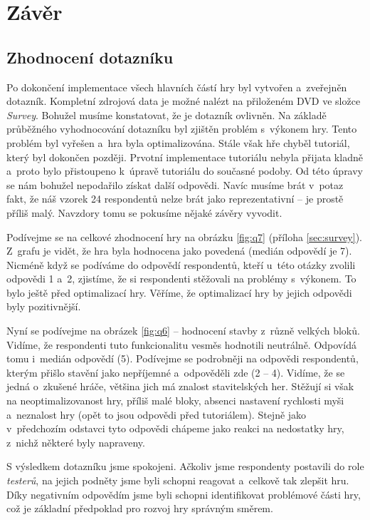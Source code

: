 
\chapter{Závěr}

\section{Zhodnocení dotazníku}
\label{sec:quest}

Po dokončení implementace všech hlavních částí hry byl vytvořen a~zveřejněn dotazník. Kompletní zdrojová data je možné nalézt na přiloženém DVD ve složce \textit{Survey}. Bohužel musíme konstatovat, že je dotazník ovlivněn. Na základě průběžného vyhodnocování dotazníku byl zjištěn problém s~výkonem hry. Tento problém byl vyřešen a~hra byla optimalizována. Stále však hře chyběl tutoriál, který byl dokončen později. Prvotní implementace tutoriálu nebyla přijata kladně a~proto bylo přistoupeno k~úpravě tutoriálu do současné podoby. Od této úpravy se nám bohužel nepodařilo získat další odpovědi. Navíc musíme brát v~potaz fakt, že náš vzorek 24 respondentů nelze brát jako reprezentativní -- je prostě příliš malý. Navzdory tomu se pokusíme nějaké závěry vyvodit.

Podívejme se na celkové zhodnocení hry na obrázku \ref{fig:q7} (příloha \ref{sec:survey}). Z~grafu je vidět, že hra byla hodnocena jako povedená (medián odpovědí je 7). Nicméně když se podíváme do odpovědí respondentů, kteří u~této otázky zvolili odpovědi 1 a~2, zjistíme, že si respondenti stěžovali na problémy s~výkonem. To bylo ještě před optimalizací hry. Věříme, že optimalizací hry by jejich odpovědi byly pozitivnější. 

Nyní se podívejme na obrázek \ref{fig:q6} -- hodnocení stavby z~různě velkých bloků. Vidíme, že respondenti tuto funkcionalitu vesměs hodnotili neutrálně. Odpovídá tomu i~medián odpovědí (5). Podívejme se podrobněji na odpovědi respondentů, kterým přišlo stavění jako nepříjemné a~odpověděli zde (2 -- 4). Vidíme, že se jedná o~zkušené hráče, většina jich má znalost stavitelských her. Stěžují si však na neoptimalizovanost hry, příliš malé bloky, absenci nastavení rychlosti myši a~neznalost hry (opět to jsou odpovědi před tutoriálem). Stejně jako v~předchozím odstavci tyto odpovědi chápeme jako reakci na nedostatky hry, z~nichž některé byly napraveny.

S výsledkem dotazníku jsme spokojeni. Ačkoliv jsme respondenty postavili do role \textit{testerů}, na jejich podněty jsme byli schopni reagovat a~celkově tak zlepšit hru. Díky negativním odpovědím jsme byli schopni identifikovat problémové části hry, což je základní předpoklad pro rozvoj hry správným směrem.

